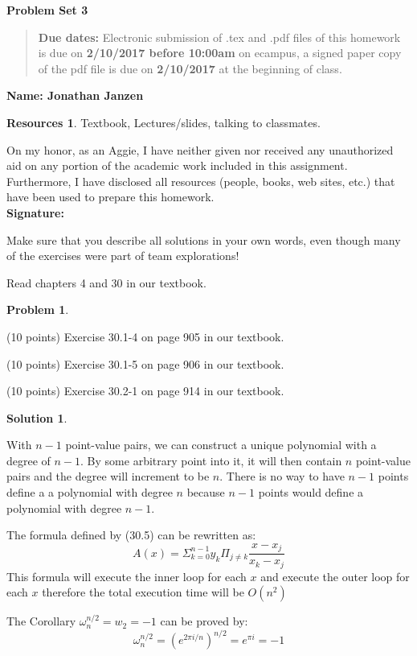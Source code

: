 \documentclass{article}
\theoremstyle{definition}
\newtheorem{problem}{Problem}
\newtheorem*{solution}{Solution}
\newtheorem*{resources}{Resources}
\newcommand{\name}[1]{\noindent\textbf{Name: #1}}
\newcommand{\honor}{\noindent On my honor, as an Aggie, I have neither
  given nor received any unauthorized aid on any portion of the
  academic work included in this assignment. Furthermore, I have
  disclosed all resources (people, books, web sites, etc.) that have
  been used to prepare this homework. \\[1ex]
 \textbf{Signature:} \underline{\hspace*{5cm}} }
\newcommand{\problemset}[1]{\begin{center}\textbf{Problem Set
      #1}\end{center}}
\newcommand{\duedate}[2]{\begin{quote}\textbf{Due dates:} Electronic
    submission of .tex and .pdf files of this homework is due on
    \textbf{#1} on ecampus, a signed paper copy of the pdf file is due
    on \textbf{#2} at the beginning of class. \end{quote} }
\begin{document}
\problemset{3}
\duedate{2/10/2017 before 10:00am}{2/10/2017}
\name{Jonathan Janzen}
\begin{resources}
Textbook, Lectures/slides, talking to classmates.
\end{resources}
\honor

\newpage
Make sure that you describe all solutions in your own words, even
though many of the exercises were part of team explorations!

Read chapters 4 and 30 in our textbook. 

\begin{problem}
\begin{compactenum}[(a)]
\item (10 points) Exercise 30.1-4 on page 905 in our textbook. 
\item (10 points) Exercise 30.1-5 on page 906 in our textbook. 
\item (10 points) Exercise 30.2-1 on page 914 in our textbook. 
\end{compactenum}
\end{problem}

\begin{solution}
\begin{compactenum}[(a)]
\item With $n-1$ point-value pairs, we can construct a unique polynomial with a degree of $n-1$. By some arbitrary point into it, it will then contain $n$ point-value pairs and the degree will increment to be $n$. There is no way to have $n-1$ points define a a polynomial with degree $n$ because $n-1$ points would define a polynomial with degree $n-1$.
\item The formula defined by (30.5) can be rewritten as:
$$A(x)=\Sigma_{k=0}^{n-1} y_k \Pi_{j \neq k} \frac{x-x_j}{x_k-x_j}$$
This formula will execute the inner loop for each $x$ and execute the outer loop for each $x$ therefore the total execution time will be $O(n^2)$
\item The Corollary $\omega_n^{n/2} = w_2 = -1$ can be proved by:
$$ \omega_n^{n/2} = (e^{2\pi i / n})^{n/2} = e^{\pi i } = -1$$
\end{compactenum}
\end{solution}
\end{document}
